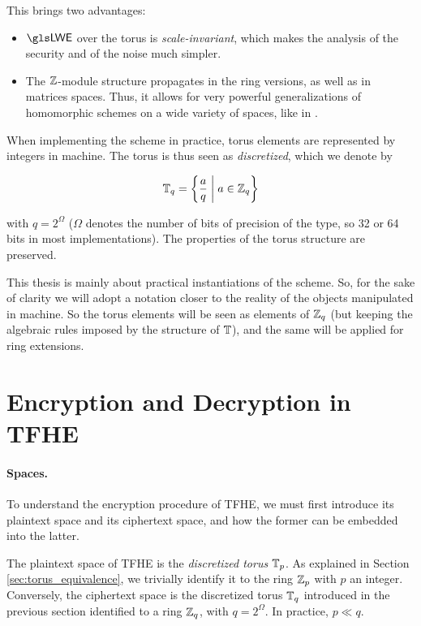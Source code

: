 This brings two advantages:

\begin{itemize}
	\item $\LWE$ over the torus is \textit{scale-invariant}, which makes the analysis of the security and of the noise much simpler.
	\item The $\mathbb{Z}$-module structure propagates in the ring versions, as well as in matrices spaces. Thus, it allows for very powerful generalizations of homomorphic schemes on a wide variety of spaces, like in \cite{chimera, AC:BCGGJ24}.
\end{itemize} 


When implementing the scheme in practice, torus elements are represented by integers in machine. The torus is thus seen as \textit{discretized}, which we denote by 

\begin{equation*}
	\mathbb{T}_q = \left \{   \frac a q \;\middle|\; a \in \mathbb{Z}_q  \right \}	
\end{equation*}

\noindent
with $q = 2^\Omega$ ($\Omega$ denotes the number of bits of precision of the type, so 32 or 64 bits in most implementations). The properties of the torus structure are preserved.


This thesis is mainly about practical instantiations of the scheme. So, for the sake of clarity we will adopt a notation closer to the reality of the objects manipulated in machine. So the torus elements will be seen as elements of $\mathbb{Z}_q$ (but keeping the algebraic rules imposed by the structure of $\mathbb{T}$), and the same will be applied for ring extensions. 



\section{Encryption and Decryption in \gls{TFHE}}
\label{sec:encryption}

\paragraph{Spaces.}

To understand the encryption procedure of \gls{TFHE}, we must first introduce its plaintext space and its ciphertext space, and how the former can be embedded into the latter.

The plaintext space of \gls{TFHE} is the \textit{discretized torus} $\mathbb{T}_p$. As explained in Section \ref{sec:torus_equivalence}, we trivially identify it to the ring $\mathbb{Z}_p$ with $p$ an integer. Conversely, the ciphertext space is the discretized torus $\mathbb{T}_q$ introduced in the previous section identified to a ring $\mathbb{Z}_q$, with $q = 2^\Omega$. In practice, $p \ll q$.


